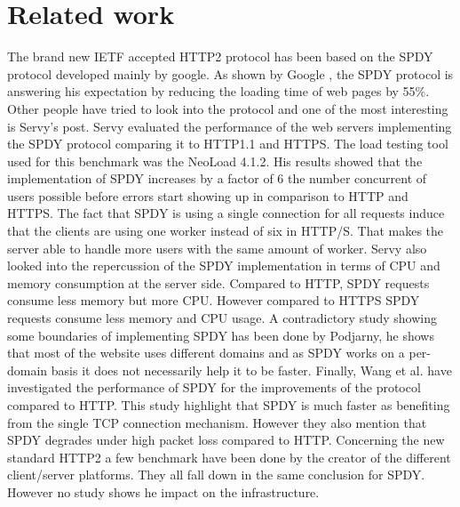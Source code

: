 \section{Related work}
\label{relwork}
The brand new IETF accepted HTTP2 protocol has been based on the SPDY protocol developed mainly by google. As shown by Google \cite{google2x}, the SPDY protocol is answering his expectation by reducing the loading time of web pages by 55\%. Other people have tried to look into the protocol and one of the most interesting is Servy's post. Servy evaluated the performance of the web servers implementing the SPDY protocol comparing it to HTTP1.1 and HTTPS. The load testing tool used for this benchmark was the NeoLoad 4.1.2. His results showed that the implementation of SPDY increases by a factor of 6 the number concurrent of users possible before errors start showing up in comparison to HTTP and HTTPS. The fact that SPDY is using a single connection for all requests induce that the clients are using one worker instead of six in HTTP/S. That makes the server able to handle more users with the same amount of worker. Servy also looked into the repercussion of the SPDY implementation in terms of CPU and memory consumption at the server side. Compared to HTTP, SPDY requests consume less memory but more CPU. However compared to HTTPS SPDY requests consume less memory and CPU usage.
A contradictory study showing some boundaries of implementing SPDY has been done by Podjarny\cite{podiatry}, he shows that most of the website uses different domains and as SPDY works on a per-domain basis it does not necessarily help it to be faster. Finally, Wang et al.\cite{wang} have investigated the performance of SPDY for the improvements of the protocol compared to HTTP. This study highlight that SPDY is much faster as benefiting from the single TCP connection mechanism. However they also mention that SPDY degrades under high packet loss compared to HTTP. 
Concerning the new standard HTTP2 a few benchmark have been done by the creator of the different client/server platforms. They all fall down in the same conclusion for SPDY. However no study shows he impact on the infrastructure.